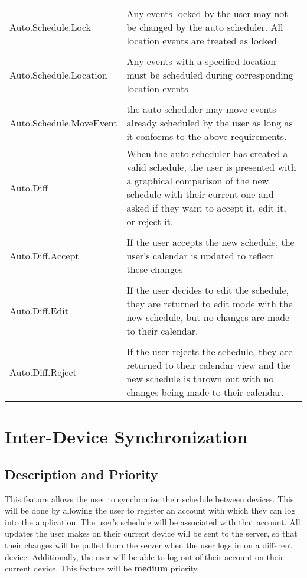 \documentclass{scrreprt}
\begin{document}
\begin{center}
\begin{longtable}{ | p{6cm} | p{9cm} | }
Auto.Schedule.Lock & Any events locked by the user may not be changed by the
auto scheduler.  All location events are treated as locked\\
& \\
Auto.Schedule.Location & Any events with a specified location must be scheduled
during corresponding location events\\
& \\
Auto.Schedule.MoveEvent & the auto scheduler may move events already scheduled by
the user as long as it conforms to the above requirements.\\
\hline
Auto.Diff & When the auto scheduler has created a valid schedule, the user is
presented with a graphical comparison of the new schedule with their current one
and asked if they want to accept it, edit it, or reject it.\\
& \\
Auto.Diff.Accept & If the user accepts the new schedule, the user's calendar is
updated to reflect these changes\\
& \\
Auto.Diff.Edit & If the user decides to edit the schedule, they are returned to
edit mode with the new schedule, but no changes are made to their calendar.\\
& \\
Auto.Diff.Reject & If the user rejects the schedule, they are returned to their
calendar view and the new schedule is thrown out with no changes being made to
their calendar.\\
\hline
\end{longtable}
\end{center}

\section{Inter-Device Synchronization}

\subsection{Description and Priority}
This feature allows the user to synchronize their schedule between devices.
This will be done by allowing the user to register an account with which they
can log into the application. The user's schedule will be associated with that
account. All updates the user makes on their current device will be sent to the
server, so that their changes will be pulled from the server when the user logs
in on a different device. Additionally, the user will be able to log out of
their account on their current device. This feature will be \textbf{medium} priority.
\end{document}
